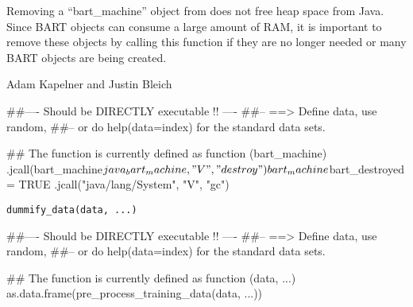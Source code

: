 \documentclass[a4paper]{book}
\begin{document}
%
\begin{Details}\relax
Removing a ``bart\_machine'' object from  does not free heap space from Java. Since BART objects can consume a large amount of RAM, it is important to remove these objects by calling this function if they are no longer needed or many BART objects are being created.
\end{Details}
%
\begin{Author}\relax
Adam Kapelner and Justin Bleich
\end{Author}
%
\begin{Examples}
\begin{ExampleCode}
##---- Should be DIRECTLY executable !! ----
##-- ==>  Define data, use random,
##--	or do  help(data=index)  for the standard data sets.

## The function is currently defined as
function (bart_machine) 
{
    .jcall(bart_machine$java_bart_machine, "V", "destroy")
    bart_machine$bart_destroyed = TRUE
    .jcall("java/lang/System", "V", "gc")
  }
\end{ExampleCode}
\end{Examples}
%
\begin{Usage}
\begin{verbatim}
dummify_data(data, ...)
\end{verbatim}
\end{Usage}
%
\begin{Arguments}
\begin{ldescription}
\item[\code{data}] 


\item[\code{...}] 


\end{ldescription}
\end{Arguments}
%
\begin{Examples}
\begin{ExampleCode}
##---- Should be DIRECTLY executable !! ----
##-- ==>  Define data, use random,
##--	or do  help(data=index)  for the standard data sets.

## The function is currently defined as
function (data, ...) 
{
    as.data.frame(pre_process_training_data(data, ...))
  }
\end{ExampleCode}
\end{Examples}
\end{document}

